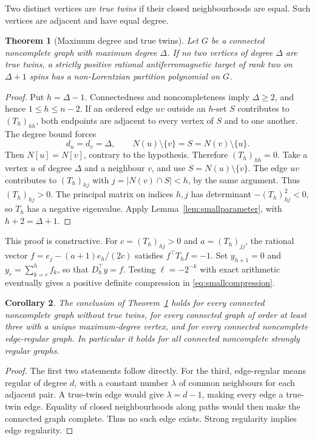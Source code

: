 \documentclass[11pt]{article}
\newtheorem{theorem}{Theorem}
\newtheorem{corollary}[theorem]{Corollary}
\theoremstyle{remark}
\begin{document}
Two distinct vertices are \emph{true twins} if their closed
neighbourhoods are equal. Such vertices are adjacent and have equal degree.

\begin{theorem}[Maximum degree and true twins]\label{thm:maxtwins}
Let $G$ be a connected noncomplete graph with maximum degree $\Delta$.
If no two vertices of degree $\Delta$ are true twins, a strictly positive
rational antiferromagnetic target of rank two on $\Delta+1$ spins has
a non-Lorentzian partition polynomial on $G$.
\end{theorem}
\begin{proof}
Put $h=\Delta-1$. Connectedness and noncompleteness imply
$\Delta\geq2$, and hence $1\leq h\leq n-2$.
If an ordered edge $uv$ outside an $h$-set $S$ contributes to
$(T_h)_{hh}$, both endpoints are adjacent to every vertex of $S$
and to one another. The degree bound forces
\[
 d_u=d_v=\Delta,\qquad N(u)\setminus\{v\}=S=N(v)\setminus\{u\}.
\]
Then $N[u]=N[v]$, contrary to the hypothesis. Therefore $(T_h)_{hh}=0$.
Take a vertex $u$ of degree $\Delta$ and a neighbour $v$, and use
$S=N(u)\setminus\{v\}$. The edge $uv$ contributes to $(T_h)_{hj}$
with $j=|N(v)\cap S|<h$, by the same argument. Thus $(T_h)_{hj}>0$.
The principal matrix on indices $h,j$ has determinant
$-(T_h)_{hj}^2<0$, so $T_h$ has a negative eigenvalue.
Apply Lemma~\ref{lem:smallparameter}, with $h+2=\Delta+1$.
\end{proof}

This proof is constructive. For $c=(T_h)_{hj}>0$ and $a=(T_h)_{jj}$,
the rational vector $f=e_j-(a+1)e_h/(2c)$ satisfies $f^\top T_hf=-1$.
Set $y_{h+1}=0$ and $y_r=\sum_{k=r}^h f_k$, so that $D_h^\top y=f$.
Testing $\ell=-2^{-k}$ with exact arithmetic eventually gives a
positive definite compression in \eqref{eq:smallcompression}.

\begin{corollary}\label{cor:edgeregular}
The conclusion of Theorem~\ref{thm:maxtwins} holds for every connected
noncomplete graph without true twins, for every connected graph of
order at least three with a unique maximum-degree vertex, and for every
connected noncomplete edge-regular graph. In particular it holds for
all connected noncomplete strongly regular graphs.
\end{corollary}
\begin{proof}
The first two statements follow directly. For the third, edge-regular
means regular of degree $d$, with a constant number $\lambda$ of
common neighbours for each adjacent pair. A true-twin edge would give
$\lambda=d-1$, making every edge a true-twin edge. Equality of closed
neighbourhoods along paths would then make the connected graph complete.
Thus no such edge exists. Strong regularity implies edge regularity.
\end{proof}
\end{document}
